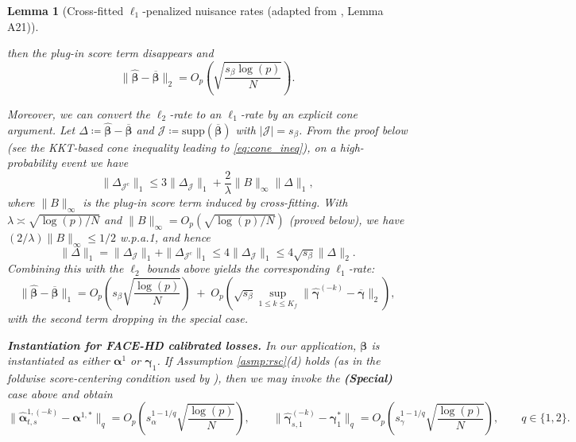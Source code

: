 \documentclass{article}
\newtheorem{lemma}[theorem]{Lemma}
\begin{document}
\begin{lemma}[Cross-fitted $\ell_1$-penalized nuisance rates (adapted from \citet{hou2025efficient}, Lemma A21)]
\begin{enumerate}
\[    \]
    then the plug-in score term disappears and
    \[
    \|\widehat{\boldsymbol{\beta}}-\overline{\boldsymbol{\beta}}\|_2
    =
    O_p\!\left(\sqrt{\frac{s_\beta\log(p)}{N}}\right).
    \]
\end{enumerate}
Moreover, we can convert the $\ell_2$-rate to an $\ell_1$-rate by an explicit cone argument.
Let $\Delta\coloneqq \widehat{\boldsymbol{\beta}}-\overline{\boldsymbol{\beta}}$ and $\mathcal{J}\coloneqq \mathrm{supp}(\overline{\boldsymbol{\beta}})$ with $|\mathcal{J}|=s_\beta$.
From the proof below (see the KKT-based cone inequality leading to \eqref{eq:cone_ineq}), on a high-probability event we have
\[
\|\Delta_{\mathcal{J}^c}\|_1 \le 3\|\Delta_{\mathcal{J}}\|_1 + \frac{2}{\lambda}\|B\|_\infty\|\Delta\|_1,
\]
where $\|B\|_\infty$ is the plug-in score term induced by cross-fitting.
With $\lambda\asymp\sqrt{\log(p)/N}$ and $\|B\|_\infty=O_p(\sqrt{\log(p)/N})$ (proved below), we have $(2/\lambda)\|B\|_\infty\le 1/2$ w.p.a.1, and hence
\[
\|\Delta\|_1
=
\|\Delta_{\mathcal{J}}\|_1+\|\Delta_{\mathcal{J}^c}\|_1
\le
4\|\Delta_{\mathcal{J}}\|_1
\le
4\sqrt{s_\beta}\|\Delta\|_2.
\]
Combining this with the $\ell_2$ bounds above yields the corresponding $\ell_1$-rate:
\[
\|\widehat{\boldsymbol{\beta}}-\overline{\boldsymbol{\beta}}\|_1
=
O_p\!\left(s_\beta\sqrt{\frac{\log(p)}{N}}\right)
\;+\;
O_p\!\left(\sqrt{s_\beta}\sup_{1\le k\le K_f}\|\widehat{\boldsymbol{\gamma}}^{(-k)}-\overline{\boldsymbol{\gamma}}\|_2\right),
\]
with the second term dropping in the special case.

\textbf{Instantiation for FACE-HD calibrated losses.} In our application, $\boldsymbol{\beta}$ is instantiated as either $\boldsymbol{\alpha}^1$ or $\boldsymbol{\gamma}_1$. If Assumption \ref{asmp:rsc}(d) holds (as in the foldwise score-centering condition used by \citet{hou2025efficient}), then we may invoke the \textbf{(Special)} case above and obtain
\[
\lVert \widehat{\boldsymbol{\alpha}}^{1,(-k)}_{t,s} - \boldsymbol{\alpha}^{1,*}\rVert_q
= O_p\!\left(s_\alpha^{1-1/q}\sqrt{\frac{\log(p)}{N}}\right),
\qquad
\lVert \widehat{\boldsymbol{\gamma}}^{(-k)}_{s,1} - \boldsymbol{\gamma}^{*}_1\rVert_q
= O_p\!\left(s_\gamma^{1-1/q}\sqrt{\frac{\log(p)}{N}}\right),
\qquad q\in\{1,2\}.
\]
\end{lemma}
\end{document}
